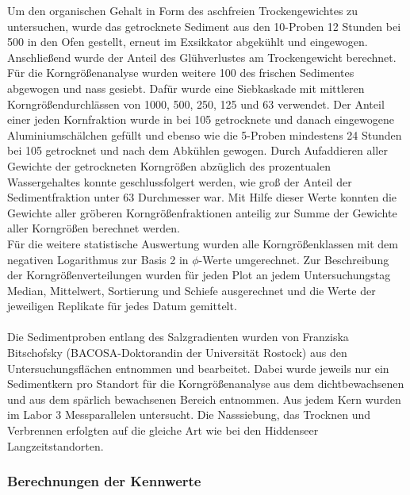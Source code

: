 Um den organischen Gehalt in Form des aschfreien Trockengewichtes zu untersuchen, wurde das getrocknete Sediment aus den \unit{10}{\milli\litre}-Proben 12 Stunden bei \unit{500}{\celsius} in den Ofen gestellt, erneut im Exsikkator abgekühlt und eingewogen. Anschließend wurde der Anteil des Glühverlustes am Trockengewicht berechnet. \\
Für die Korngrößenanalyse wurden weitere \unit{100}{\gram} des frischen Sedimentes abgewogen und nass gesiebt. Dafür wurde eine Siebkaskade mit mittleren Korngrößendurchlässen von \unit{1000}{\micro\metre}, \unit{500}{\micro\metre}, \unit{250}{\micro\metre}, \unit{125}{\micro\metre} und \unit{63}{\micro\metre} verwendet. Der Anteil einer jeden Kornfraktion wurde in bei \unit{105}{\celsius} getrocknete  und danach eingewogene Aluminiumschälchen gefüllt und ebenso wie die \unit{5}{\milli\litre}-Proben mindestens 24 Stunden bei \unit{105}{\celsius} getrocknet und nach dem Abkühlen gewogen. Durch Aufaddieren aller Gewichte der getrockneten Korngrößen abzüglich des prozentualen Wassergehaltes konnte geschlussfolgert werden, wie groß der Anteil der Sedimentfraktion unter \unit{63}{\micro\metre} Durchmesser war. Mit Hilfe dieser Werte konnten die Gewichte aller gröberen Korngrößenfraktionen anteilig zur Summe der Gewichte aller Korngrößen berechnet werden.\\
Für die weitere statistische Auswertung wurden alle Korngrößenklassen mit dem negativen Logarithmus zur Basis 2 in $ \phi $-Werte umgerechnet. 
Zur Beschreibung der Korngrößenverteilungen wurden für jeden Plot an jedem Untersuchungstag Median, Mittelwert, Sortierung und Schiefe ausgerechnet und die Werte der jeweiligen Replikate für jedes Datum gemittelt.\\
\\
Die Sedimentproben entlang des Salzgradienten wurden von Franziska Bitschofsky (BACOSA-Doktorandin der Universität Rostock) aus den Untersuchungsflächen entnommen und bearbeitet. Dabei wurde jeweils nur ein Sedimentkern pro Standort für die Korngrößenanalyse aus dem dichtbewachsenen und aus dem spärlich bewachsenen Bereich entnommen. Aus jedem Kern wurden im Labor 3 Messparallelen untersucht. Die Nasssiebung, das Trocknen und Verbrennen erfolgten auf die gleiche Art wie bei den Hiddenseer Langzeitstandorten.


 
\subsubsection{Berechnungen der Kennwerte}


